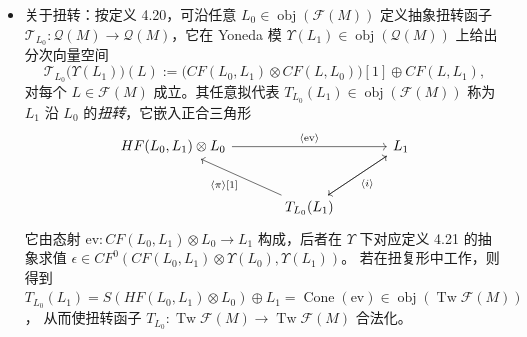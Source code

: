 \begin{itemize}
  取 $\mathcal F(M)$ 的分裂封闭 $(\Pi\mathcal F(M),\Upsilon_{\mathcal F(M)})$
  （命题 4.13），便可纳入分裂对象。对扭复形而言，
  $\Pi(\operatorname{Tw}\mathcal F(M))$ 的优点在于它仍是
  $A_\infty$-三角的（由引理 4.14），于是分裂封闭导出范畴
  \[
  \mathsf D^\pi(\mathcal F(M)):=H^0\bigl(\Pi(\operatorname{Tw}\mathcal F(M))\bigr)
  \]
  是标准的三角范畴。具体地说，$\mathcal F(M)$ 分裂生成
  $\Pi(\operatorname{Tw}\mathcal F(M))$：后者的任意对象都可由拉格朗日
  子流形出发，作一切可能的映射锥与平移、迭代，最后取所得幂等自同态的像
  而得。

  一个有用的结果是：拟等价的 Fukaya 范畴其分裂封闭导出范畴也等价，
  这又可加强为分裂生成的全子范畴之间的拟等价（即推论 4.19）。
  \item 关于扭转：按定义 4.20，可沿任意
  $L_0\in\operatorname{obj}(\mathcal F(M))$ 定义抽象扭转函子
  $\mathcal T_{L_0}:\mathcal Q(M)\to\mathcal Q(M)$，它在 Yoneda 模
  $\Upsilon(L_1)\in\operatorname{obj}(\mathcal Q(M))$ 上给出分次向量空间
  \[
  \mathcal T_{L_0}\bigl(\Upsilon(L_1)\bigr)(L)
  :=\bigl(CF(L_0,L_1)\otimes CF(L,L_0)\bigr)[1]\oplus CF(L,L_1),
  \]
  对每个 $L\in\mathcal F(M)$ 成立。其任意拟代表
  $T_{L_0}(L_1)\in\operatorname{obj}(\mathcal F(M))$ 称为 $L_1$ 沿
  $L_0$ 的\emph{扭转}，它嵌入正合三角形
  \begin{equation}
  \begin{tikzcd}[row sep=2.6em, column sep=3.4em]
  HF(L_0,L_1)\otimes L_0 \arrow[rr, "\langle \mathrm{ev}\rangle"] & & L_1 \arrow[dl] \\
  & T_{L_0}(L_1) \arrow[ul, "\langle\pi\rangle{[}1{]}"] \arrow[ur, "\langle i\rangle" swap] &
  \end{tikzcd}
  \label{eq:6.89}
  \end{equation}
  它由态射 $\mathrm{ev}:CF(L_0,L_1)\otimes L_0\to L_1$ 构成，后者在
  $\Upsilon$ 下对应定义 4.21 的抽象求值
  $\epsilon\in CF^0(CF(L_0,L_1)\otimes\Upsilon(L_0),\Upsilon(L_1))$。
  若在扭复形中工作，则得到
  $T_{L_0}(L_1)=S(HF(L_0,L_1)\otimes L_0)\oplus L_1
  =\operatorname{Cone}(\mathrm{ev})\in\operatorname{obj}(\operatorname{Tw}\mathcal F(M))$，
  从而使扭转函子
  $T_{L_0}:\operatorname{Tw}\mathcal F(M)\to\operatorname{Tw}\mathcal F(M)$
  合法化。
\end{itemize}


